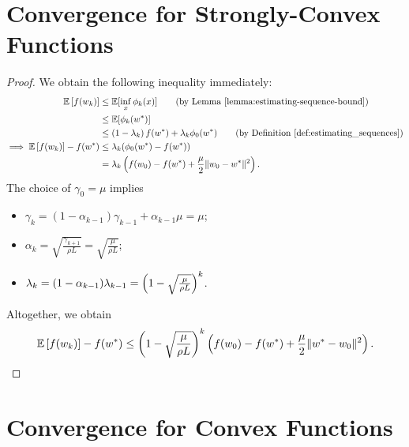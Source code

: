 \section{Convergence for Strongly-Convex Functions}\label{app:agd-sc}

\scAGD*
\begin{proof}
    We obtain the following inequality immediately:
    \begin{align*}
        \E\sbr{f(\wk)} &\leq \E[\inf_x \phi_k(x)] \tag{by Lemma~\ref{lemma:estimating-sequence-bound}}\\
        &\leq \E[\phi_k(\wopt)] \\
        &\leq \rbr{1 - \lambda_k} f(\wopt) + \lambda_k \phi_0(\wopt) \tag{by Definition~\ref{def:estimating_sequences}}\\
        \implies \E\sbr{f(\wk)} - f(\wopt) &\leq \lambda_k (\phi_0(\wopt) - f(\wopt))\\
                                           &= \lambda_k \rbr{f(\w_0) - f(\wopt) + \frac{\mu}{2}\norm{\w_0 - \wopt}^2 }.
    \end{align*}
    The choice of \( \gamma_0 = \mu \) implies
    \begin{itemize}
        \item \(  \gamma_{k}  = (1 - \alpha_{k-1}) \gamma_{k-1} + \alpha_{k-1} \mu = \mu \);
        \item \( \alpha_{k} = \sqrt{\frac{\gamma_{k+1}}{\rho L}} = \sqrt{\frac{\mu}{\rho L}} \);
        \item \( \lambda_{k} = (1 - \alpha_{k-1}) \lambda_{k-1} = \left(1 - \sqrt{\frac{\mu}{\rho L}}\right)^{k} \).
    \end{itemize}
    Altogether, we obtain
    \[ \mathbb{E}\left[f(w_k)\right] - f(w^*) \leq \left(1 - \sqrt{\frac{\mu}{\rho L}}\right)^{k} \left( f(w_0) - f(w^*) + \frac{\mu}{2} \|w^* - w_0\|^2 \right). \]
\end{proof}


\section{Convergence for Convex Functions}\label{app:agd-convex}

